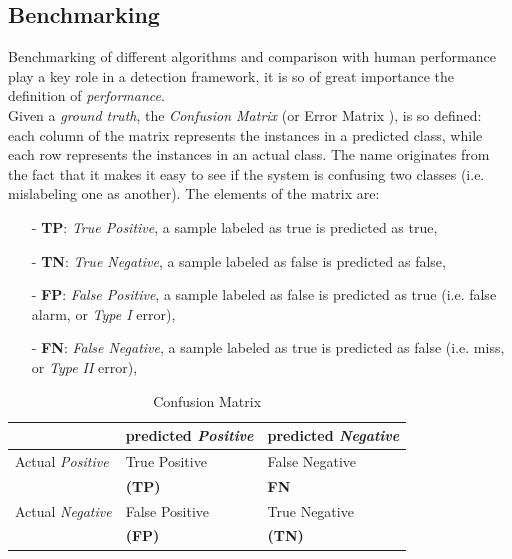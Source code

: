 \vspace{0.5cm}

\subsection{Benchmarking}

Benchmarking of different algorithms and comparison with human performance play a key role in a detection framework, it is so of great importance the definition of \textit{performance}.\\
Given a \textit{ground truth}, the \textit{Confusion Matrix} (or Error Matrix \cite{stehman1997selecting}), is so defined:
each column of the matrix represents the instances in a predicted class, while each row represents the instances in an actual class.
The name originates from the fact that it makes it easy to see if the system is confusing two classes (i.e. mislabeling one as another).
The elements of the matrix are:
\begin{itemize}
 \item [-] \textbf{TP}: \textit{True Positive}, a sample labeled as true is predicted as true,
 \item [-] \textbf{TN}: \textit{True Negative}, a sample labeled as false is predicted as false,
 \item [-] \textbf{FP}: \textit{False Positive}, a sample labeled as false is predicted as true (i.e. false alarm, or \textit{Type I} error),
 \item [-] \textbf{FN}: \textit{False Negative}, a sample labeled as true is predicted as false (i.e. miss, or \textit{Type II} error),
\end{itemize}


\begin{table}[!hbt]
 \caption{Confusion Matrix}
 \centering
 \begin{tabularx}{210pt}{ >{\centering\arraybackslash} X |>{\centering\arraybackslash} X |>{\centering\arraybackslash} X }
   & predicted \textit{Positive} & predicted \textit{Negative} \\
   \hline
   Actual \textit{Positive} & \cellcolor{YellowGreen}True Positive  & \cellcolor{OrangeRed}False Negative \\
                            & \cellcolor{YellowGreen} \textbf{(TP)} & \cellcolor{OrangeRed} \textbf{FN} \\
   \hline
   Actual \textit{Negative} & \cellcolor{OrangeRed}False Positive & \cellcolor{YellowGreen}True Negative \\
                            & \cellcolor{OrangeRed} \textbf{(FP)} & \cellcolor{YellowGreen} \textbf{(TN)} \\
  \hline
 \end{tabularx}
 \label{ch3:tab1}
\end{table}

